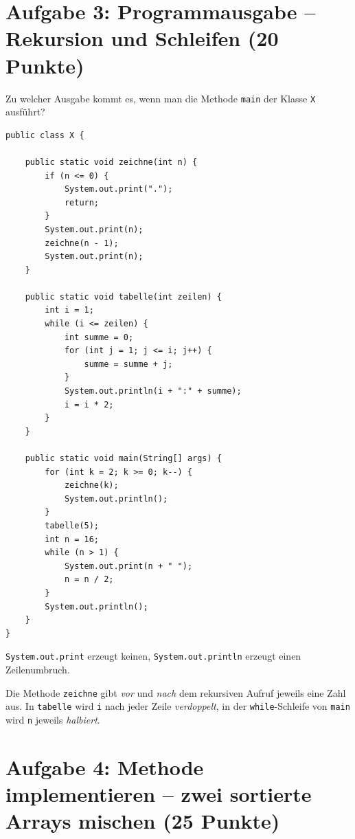 \documentclass[
	fontsize=12pt,
	paper=a4,
	numbers=noenddot,
	parskip=half,
	openany
]{scrbook}
\begin{document}
\clearpage
\section*{Aufgabe 3: Programmausgabe -- Rekursion und Schleifen \hfill (20 Punkte)}

Zu welcher Ausgabe kommt es, wenn man die Methode \texttt{main} der Klasse \texttt{X} ausführt?

\begin{lstlisting}
public class X {

    public static void zeichne(int n) {
        if (n <= 0) {
            System.out.print(".");
            return;
        }
        System.out.print(n);
        zeichne(n - 1);
        System.out.print(n);
    }

    public static void tabelle(int zeilen) {
        int i = 1;
        while (i <= zeilen) {
            int summe = 0;
            for (int j = 1; j <= i; j++) {
                summe = summe + j;
            }
            System.out.println(i + ":" + summe);
            i = i * 2;
        }
    }

    public static void main(String[] args) {
        for (int k = 2; k >= 0; k--) {
            zeichne(k);
            System.out.println();
        }
        tabelle(5);
        int n = 16;
        while (n > 1) {
            System.out.print(n + " ");
            n = n / 2;
        }
        System.out.println();
    }
}
\end{lstlisting}

\begin{hinweis}[Hinweis]
	\texttt{System.out.print} erzeugt keinen, \texttt{System.out.println} erzeugt einen Zeilenumbruch.
\end{hinweis}

\begin{hinweis}[Empfehlung]
	Die Methode \texttt{zeichne} gibt \emph{vor} und \emph{nach} dem rekursiven Aufruf jeweils eine Zahl aus. In \texttt{tabelle} wird \texttt{i} nach jeder Zeile \emph{verdoppelt}, in der \texttt{while}-Schleife von \texttt{main} wird \texttt{n} jeweils \emph{halbiert}.
\end{hinweis}

\clearpage
\section*{Aufgabe 4: Methode implementieren -- zwei sortierte Arrays mischen \hfill (25 Punkte)}
\end{document}
